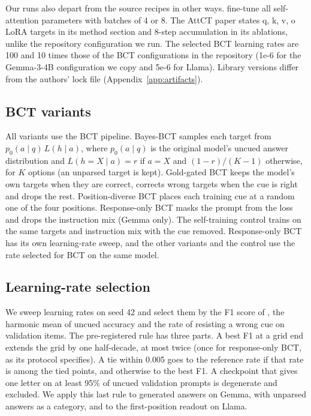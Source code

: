 \documentclass[11pt]{article}
\newcommand{\gemma}{Gemma}\newcommand{\gemmafull}{Gemma-2-2B-it}
\newcommand{\llama}{Llama}\newcommand{\llamafull}{Llama-3.1-8B-Instruct}
\begin{document}
Our runs also depart from the source recipes in other ways. \citet{irpan2025consistency} fine-tune all self-attention parameters with batches of 4 or 8. The AttCT paper states q, k, v, o LoRA targets in its method section and 8-step accumulation in its ablations, unlike the repository configuration we run. The selected BCT learning rates are 100 and 10 times those of the BCT configurations in the repository (1e-6 for the Gemma-3-4B configuration we copy and 5e-6 for \llama). Library versions differ from the authors' lock file (Appendix~\ref{app:artifacts}).

\subsection{BCT variants}
All variants use the BCT pipeline. Bayes-BCT samples each target from $p_0(a\mid q)\,L(h\mid a)$, where $p_0(a\mid q)$ is the original model's uncued answer distribution and $L(h{=}X\mid a)=r$ if $a{=}X$ and $(1-r)/(K-1)$ otherwise, for $K$ options (an unparsed target is kept). Gold-gated BCT keeps the model's own targets when they are correct, corrects wrong targets when the cue is right and drops the rest. Position-diverse BCT places each training cue at a random one of the four positions. Response-only BCT masks the prompt from the loss and drops the instruction mix (\gemma{} only). The self-training control trains on the same targets and instruction mix with the cue removed. Response-only BCT has its own learning-rate sweep, and the other variants and the control use the rate selected for BCT on the same model.

\subsection{Learning-rate selection}
\label{app:selection}
\begin{table}[t]\centering\scriptsize\setlength{\tabcolsep}{4pt}
\tabSelection
\caption{Stored and re-selected learning rates, with the validation F1 at every grid point (unmerged adapters, generated answers). $^d$ marks a degenerate point (excluded), and $^\dagger$ an exploratory variant.}
\label{tab:selection}
\end{table}
We sweep learning rates on seed 42 and select them by the F1 score of \citet{irpan2025consistency}, the harmonic mean of uncued accuracy and the rate of resisting a wrong cue on validation items. The pre-registered rule has three parts. A best F1 at a grid end extends the grid by one half-decade, at most twice (once for response-only BCT, as its protocol specifies). A tie within 0.005 goes to the reference rate if that rate is among the tied points, and otherwise to the best F1. A checkpoint that gives one letter on at least 95\% of uncued validation prompts is degenerate and excluded. We apply this last rule to generated answers on \gemma, with unparsed answers as a category, and to the first-position readout on \llama.
\end{document}
